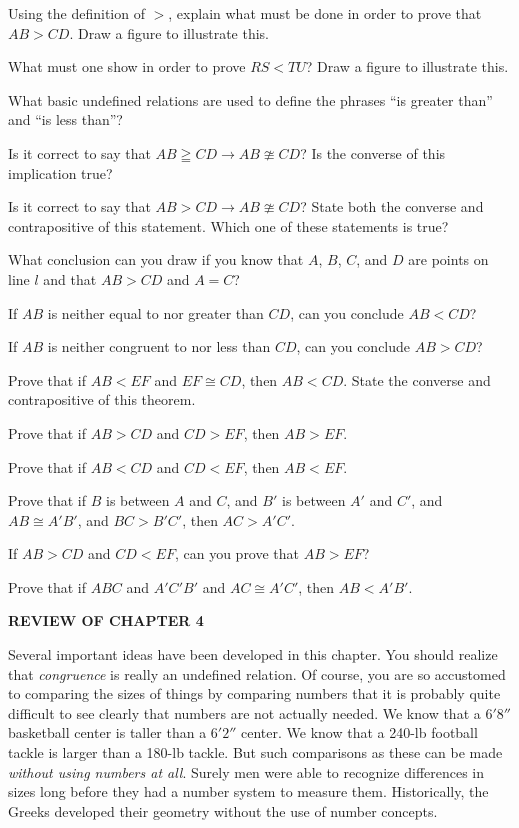 \documentclass[11pt]{book}
\newcommand{\IVhead}[1]{%
  \par\bigskip\begin{center}\bfseries\large\MakeUppercase{#1}\end{center}%
  \par\nopagebreak\medskip}
\begin{document}
\begin{exercisecols}
\begin{exlist}
\item Using the definition of $>$, explain what must be done in order to prove
      that $AB > CD$. Draw a figure to illustrate this.
\item What must one show in order to prove $RS < TU$? Draw a figure to
      illustrate this.
\item What basic undefined relations are used to define the phrases ``is greater
      than'' and ``is less than''?
\item Is it correct to say that $AB \geqq CD \rightarrow AB \ncong CD$? Is the
      converse of this implication true?
\item Is it correct to say that $AB > CD \rightarrow AB \ncong CD$? State both
      the converse and contrapositive of this statement. Which one of these
      statements is true?
\item What conclusion can you draw if you know that $A$, $B$, $C$, and $D$ are
      points on line $l$ and that $AB > CD$ and $A = C$?
\item If $AB$ is neither equal to nor greater than $CD$, can you conclude
      $AB < CD$?
\item If $AB$ is neither congruent to nor less than $CD$, can you conclude
      $AB > CD$?
\item[\stex 9.] Prove that if $AB < EF$ and $EF \cong CD$, then $AB < CD$.
      State the converse and contrapositive of this theorem.
\item[\stex 10.] Prove that if $AB > CD$ and $CD > EF$, then $AB > EF$.
\item[\stex 11.] Prove that if $AB < CD$ and $CD < EF$, then $AB < EF$.
\item[\stex 12.] Prove that if $B$ is between $A$ and $C$, and $B'$ is between
      $A'$ and $C'$, and $AB \cong A'B'$, and $BC > B'C'$, then $AC > A'C'$.
\item[13.] If $AB > CD$ and $CD < EF$, can you prove that $AB > EF$?
\item[\stex 14.] Prove that if $ABC$ and $A'C'B'$ and $AC \cong A'C'$, then
      $AB < A'B'$.
\end{exlist}

\IVhead{Review of Chapter 4}

Several important ideas have been developed in this chapter. You should realize
that \emph{congruence} is really an undefined relation. Of course, you are so
accustomed to comparing the sizes of things by comparing numbers that it is
probably quite difficult to see clearly that numbers are not actually needed. We
know that a $6'8''$ basketball center is taller than a
$6'2''$ center. We know that a 240-lb football tackle is
larger than a 180-lb tackle. But such comparisons as these can be made
\emph{without using numbers at all}. Surely men were able to recognize
differences in sizes long before they had a number system to measure them.
Historically, the Greeks developed their geometry without the use of number
concepts.


\end{exercisecols}
\end{document}

